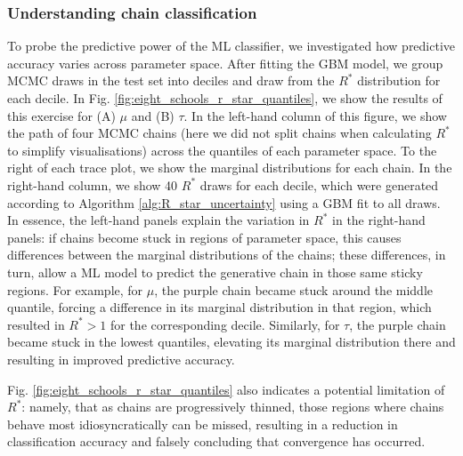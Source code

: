\documentclass[ba]{imsart}
\numberwithin{equation}{section}
\theoremstyle{plain}
\begin{document}
\subsubsection{Understanding chain classification}
To probe the predictive power of the ML classifier, we investigated how predictive accuracy varies across parameter space. After fitting the GBM model, we group MCMC draws in the test set into deciles and draw from the $R^*$ distribution for each decile. In Fig. \ref{fig:eight_schools_r_star_quantiles}, we show the results of this exercise for (A) $\mu$ and (B) $\tau$. In the left-hand column of this figure, we show the path of four MCMC chains (here we did not split chains when calculating $R^*$ to simplify visualisations) across the quantiles of each parameter space. To the right of each trace plot, we show the marginal distributions for each chain. In the right-hand column, we show 40 $R^*$ draws for each decile, which were generated according to Algorithm \ref{alg:R_star_uncertainty} using a GBM fit to all draws. In essence, the left-hand panels explain the variation in $R^*$ in the right-hand panels: if chains become stuck in regions of parameter space, this causes differences between the marginal distributions of the chains; these differences, in turn, allow a ML model to predict the generative chain in those same sticky regions. For example, for $\mu$, the purple chain became stuck around the middle quantile, forcing a difference in its marginal distribution in that region, which resulted in $R^*>1$ for the corresponding decile. Similarly, for $\tau$, the purple chain became stuck in the lowest quantiles, elevating its marginal distribution there and resulting in improved predictive accuracy.

Fig. \ref{fig:eight_schools_r_star_quantiles} also indicates a potential limitation of $R^*$: namely, that as chains are progressively thinned, those regions where chains behave most idiosyncratically can be missed, resulting in a reduction in classification accuracy and falsely concluding that convergence has occurred.
\end{document}
